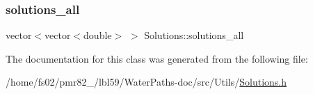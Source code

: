 \subsubsection{\texorpdfstring{solutions\+\_\+all}{solutions\_all}}
{\footnotesize\ttfamily vector$<$vector$<$double$>$ $>$ Solutions\+::solutions\+\_\+all}



The documentation for this class was generated from the following file\+:\begin{DoxyCompactItemize}
\item 
/home/fs02/pmr82\+\_/lbl59/\+Water\+Paths-\/doc/src/\+Utils/\mbox{\hyperlink{Solutions_8h}{Solutions.\+h}}\end{DoxyCompactItemize}
